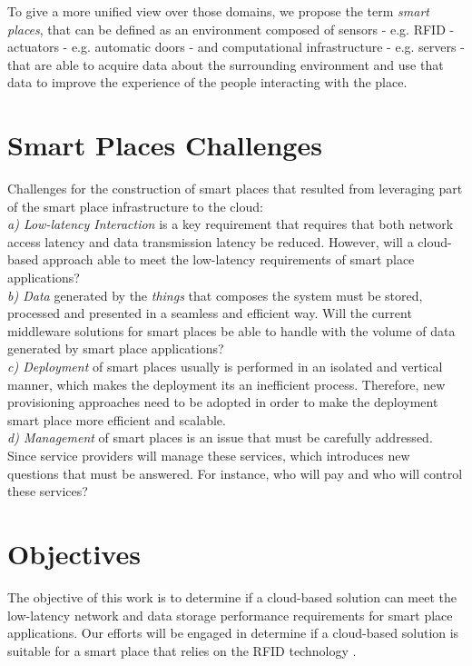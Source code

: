 To give a more unified view over those domains, we propose the term \textit{smart places},
that can be defined as an environment composed of sensors - e.g. RFID - actuators - e.g. automatic
doors - and computational infrastructure - e.g. servers - that are able to acquire data about the
surrounding environment and use that data to improve the experience of the people interacting with
the place.

\section{Smart Places Challenges}
\label{section:challenges}
Challenges \cite{caceres2012ubicomp} for the construction of smart places that resulted from leveraging
part of the smart place infrastructure to the cloud:\\

\textit{a) Low-latency Interaction} is a key requirement that requires that both network access
latency and data transmission latency be reduced. However, will a cloud-based
approach able to meet the low-latency requirements of smart place applications?\\

\textit{b) Data} generated by the \textit{things} that composes the system must be stored, processed
and presented in a seamless and efficient way. Will the current middleware solutions for smart places
\cite{floerkemeier2007rfid}\cite{eisenhauer2010hydra}\cite{de2008socrades} be able to handle with
the volume of data generated by smart place applications?\\

\textit{c) Deployment} of smart places usually is performed in an isolated and vertical manner, which
makes the deployment its an inefficient process. Therefore, new provisioning approaches need to be
adopted in order to make the deployment smart place more efficient and scalable.\\

\textit{d) Management} of smart places is an issue that must be carefully addressed. Since
service providers will manage these services, which introduces new questions that must be
answered. For instance, who will pay and who will control these services?

\section{Objectives}
\label{section:objectives}
The objective of this work is to determine if a cloud-based solution can meet the low-latency network
and data storage performance requirements for smart place applications. Our efforts will be engaged in
determine if a cloud-based solution is suitable for a smart place that relies on the RFID technology
\cite{want2006introduction}.

